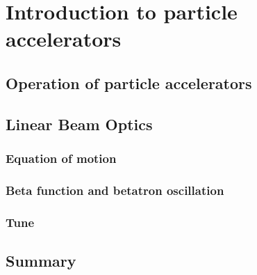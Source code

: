 \chapter{Introduction to particle accelerators}
\label{cha:Introduction to particle accelerators}

\section{Operation of particle accelerators}

\section{Linear Beam Optics}
\subsection{Equation of motion}
\subsection{Beta function and betatron oscillation}
\subsection{Tune}

\section{Summary}